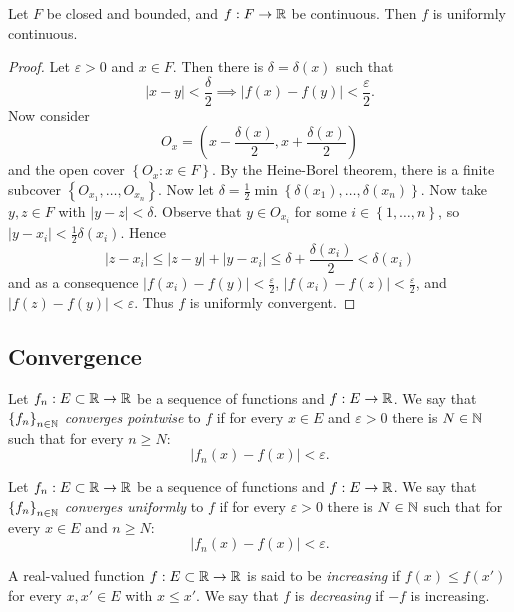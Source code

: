 \begin{proposition}[]
	Let $F$ be closed and bounded, and $f: F \to \mathbb{R}$ be continuous.
	Then $f$ is uniformly continuous.
\end{proposition}

\begin{proof}
	Let $\varepsilon > 0$ and $x \in F$.
	Then there is $\delta = \delta(x)$ such that
	\[
		\left\lvert x - y \right\rvert < \frac{\delta}{2}
		\implies \left\lvert f(x) - f(y) \right\rvert 
		< \frac{\varepsilon}{2}.
	\]
	Now consider
	\[
		O_x = \left( 
			x - \frac{\delta(x)}{2},
			x + \frac{\delta(x)}{2}
		\right)
	\]
	and the open cover $\left\{
		O_x: x \in F
	\right\}$.
	By the Heine-Borel theorem, there is a finite subcover
	$\left\{
		O_{x_1}, \ldots, O_{x_n}
	\right\}$.
	Now let $\delta = \frac12 \min\left\{
		\delta(x_1), \ldots, \delta(x_n)
	\right\}$.
	Now take $y, z \in F$ with $\left\lvert y - z \right\rvert < \delta$.
	Observe that $y \in O_{x_i}$ for some $i \in \left\{
		1,\ldots,n
	\right\}$,
	so $\left\lvert y - x_i \right\rvert < \frac12 \delta(x_i)$.
	Hence
	\[
		\left\lvert z - x_i \right\rvert
		\leq \left\lvert z - y \right\rvert
		+ \left\lvert y - x_i \right\rvert
		\leq \delta + \frac{\delta(x_i)}{2} 
		< \delta(x_i)
	\]
	and as a consequence $
		\left\lvert f(x_i) - f(y) \right\rvert < \frac{\varepsilon}{2}
	$, $
	\left\lvert f(x_i) - f(z) \right\rvert < \frac{\varepsilon}{2}
	$, and $
	\left\lvert f(z) - f(y) \right\rvert < \varepsilon
	$. 
	Thus $f$ is uniformly convergent.
\end{proof}

\subsection{Convergence}

\begin{definition}
	Let $f_n: E \subset \mathbb{R} \to \mathbb{R}$ be a sequence of functions
	and $f: E \to \mathbb{R}$.
	We say that $\left\{
		f_n
	\right\}_{n \in \mathbb{N}}$
	\emph{converges pointwise} to $f$
	if for every $x \in E$ and $\varepsilon > 0$
	there is $N \in \mathbb{N}$
	such that for every $n \geq N$:
	\[
		\left\lvert f_n(x) - f(x) \right\rvert < \varepsilon.
	\]
\end{definition}


\begin{definition}
	Let $f_n: E \subset \mathbb{R} \to \mathbb{R}$ be a sequence of functions
	and $f: E \to \mathbb{R}$.
	We say that $\left\{
		f_n
	\right\}_{n \in \mathbb{N}}$
	\emph{converges uniformly} to $f$
	if for every $\varepsilon > 0$
	there is $N \in \mathbb{N}$
	such that for every $x \in E$ and $n \geq N$:
	\[
		\left\lvert f_n(x) - f(x) \right\rvert < \varepsilon.
	\]
\end{definition}

\begin{definition}[]
	A real-valued function $f: E \subset \mathbb{R} \to \mathbb{R}$
	is said to be \emph{increasing} if
	$f(x) \leq f(x')$ for every $x, x' \in E$ with $x \leq x'$.
	We say that $f$ is \emph{decreasing}
	if $-f$ is increasing.
\end{definition}

